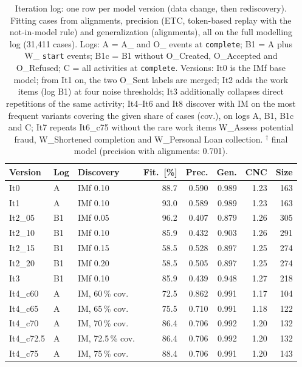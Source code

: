 \begin{table}[h]
  \caption{Iteration log: one row per model version (data change, then
  rediscovery). Fitting cases from alignments, precision (ETC, token-based
  replay with the not-in-model rule) and generalization (alignments), all on
  the full modelling log (31,411 cases). Logs: A = A\_ and O\_ events at
  \texttt{complete}; B1 = A plus W\_ \texttt{start} events; B1c = B1 without
  O\_Created, O\_Accepted and O\_Refused; C = all activities at
  \texttt{complete}. Versions: It0 is the IMf base model; from It1 on, the two
  O\_Sent labels are merged; It2 adds the work items (log B1) at four noise
  thresholds; It3 additionally collapses direct repetitions of the same
  activity; It4--It6 and It8 discover with IM on the most frequent variants
  covering the given share of cases (cov.), on logs A, B1, B1c and C; It7
  repeats It6\_c75 without the rare work items W\_Assess potential fraud,
  W\_Shortened completion and W\_Personal Loan collection.
  $^\dagger$ final model (precision with alignments: 0.701).}
  \centering\small
  \begin{tabular}{lllrrrrr}
    \toprule
    \textbf{Version} & \textbf{Log} & \textbf{Discovery} & \textbf{Fit.\ [\%]} &
    \textbf{Prec.} & \textbf{Gen.} & \textbf{CNC} & \textbf{Size} \\
    \midrule
It0 & A & IMf 0.10 & 88.7 & 0.590 & 0.989 & 1.23 & 163 \\
It1 & A & IMf 0.10 & 93.0 & 0.589 & 0.989 & 1.23 & 163 \\
It2\_05 & B1 & IMf 0.05 & 96.2 & 0.407 & 0.879 & 1.26 & 305 \\
It2\_10 & B1 & IMf 0.10 & 85.9 & 0.432 & 0.903 & 1.26 & 291 \\
It2\_15 & B1 & IMf 0.15 & 58.5 & 0.528 & 0.897 & 1.25 & 274 \\
It2\_20 & B1 & IMf 0.20 & 58.5 & 0.505 & 0.897 & 1.25 & 274 \\
It3 & B1 & IMf 0.10 & 85.9 & 0.439 & 0.948 & 1.27 & 218 \\
It4\_c60 & A & IM, 60\,\% cov. & 72.5 & 0.862 & 0.991 & 1.17 & 104 \\
It4\_c65 & A & IM, 65\,\% cov. & 75.5 & 0.710 & 0.991 & 1.18 & 122 \\
It4\_c70 & A & IM, 70\,\% cov. & 86.4 & 0.706 & 0.992 & 1.20 & 132 \\
It4\_c72.5 & A & IM, 72.5\,\% cov. & 86.4 & 0.706 & 0.992 & 1.20 & 132 \\
It4\_c75 & A & IM, 75\,\% cov. & 88.4 & 0.706 & 0.991 & 1.20 & 143 \\

\end{tabular}
\end{table}
